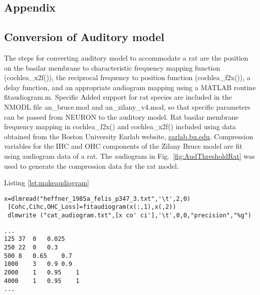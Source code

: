 \graphicspath{{/media/data/Work/cnstellate/}{/media/data/Work/cnstellate/Responses/}{../figures/}{./gfx/}}

\begin{appendix}
\section{Appendix}
\label{sec:chp3appendix}
\subsection{Conversion of Auditory model}


The steps for converting \citet{ZilanyBruce:2007} auditory model to
accommodate a rat are the position on the basilar membrane to
characteristic frequency mapping function (\mbox{\textsf{cochlea\_x2f()}}), the
reciprocal frequency to position function (\mbox{\textsf{cochlea\_f2x()}}), a
delay function, and an appropriate audiogram mapping using a MATLAB
routine \mbox{\textsf{fitaudiogram.m}}.  Specific Added support for rat species
are included in the NMODL file \mbox{\textsf{an\_bruce.mod}} and \mbox{\textsf{an\_zilany\_v4.mod}}, so that specific
parameters can be passed from NEURON to the auditory model.  Rat
basilar membrane frequency mapping in \mbox{\textsf{cochlea\_f2x()}} and
\mbox{\textsf{cochlea\_x2f()}} included using data obtained from the Boston University Earlab
website, \url{earlab.bu.edu}.  Compression variables for the IHC and OHC
components of the Zilany Bruce model are fit using audiogram data of a
rat.  The audiogram in Fig.~\ref{fig:AudThresholdRat} was used to
generate the compression data for the rat model.

\medskip{}

Listing \ref{lst:makeaudiogram}
\begin{lstlisting}[label=lst:makeaudiogram,caption=Using fitaudiogram.m to create COHC and CIHC vectors for the cat.]
 x=dlmread("heffner_1985a_felis_p347_3.txt",'\t',2,0)
 [Cohc,Cihc,OHC_Loss]=fitaudiogram(x(:,1),x(,2))
 dlmwrite ("cat_audiogram.txt",[x co' ci'],'\t',0,0,"precision","%g")
\end{lstlisting}


\begin{lstlisting}[label=lst:cataudiogram,caption=Portion of cat\_audiogram.txt]
...
125	37	0	0.025
250	22	0	0.3
500	8	0.65	0.7
1000	3	0.9	0.9
2000	1	0.95	1
4000	1	0.95	1
...
\end{lstlisting}



\end{appendix}
